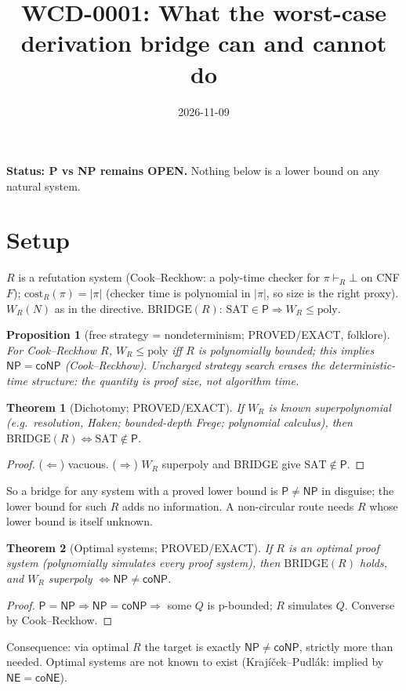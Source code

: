 \documentclass{article}\usepackage{amsmath,amssymb,amsthm}
\newtheorem{thm}{Theorem}\newtheorem{prop}{Proposition}\newtheorem{cor}{Corollary}
\begin{document}
\title{WCD-0001: What the worst-case derivation bridge can and cannot do}\date{2026-11-09}\maketitle
\noindent\textbf{Status: P vs NP remains OPEN.} Nothing below is a lower bound on any natural system.

\section*{Setup}
$R$ is a refutation system (Cook--Reckhow: a poly-time checker for $\pi\vdash_R\bot$ on CNF $F$); $\mathrm{cost}_R(\pi)=|\pi|$ (checker time is polynomial in $|\pi|$, so size is the right proxy).
$W_R(N)$ as in the directive. $\mathrm{BRIDGE}(R)$: $\mathrm{SAT}\in\mathsf P\Rightarrow W_R\le\mathrm{poly}$.

\begin{prop}[free strategy = nondeterminism; PROVED/EXACT, folklore]
For Cook--Reckhow $R$, $W_R\le\mathrm{poly}$ iff $R$ is polynomially bounded; this implies $\mathsf{NP}=\mathsf{coNP}$ (Cook--Reckhow). Uncharged strategy search erases the deterministic-time structure: the quantity is proof size, not algorithm time.
\end{prop}

\begin{thm}[Dichotomy; PROVED/EXACT]
If $W_R$ is known superpolynomial (e.g.\ resolution, Haken; bounded-depth Frege; polynomial calculus), then $\mathrm{BRIDGE}(R)\iff \mathrm{SAT}\notin\mathsf P$.
\end{thm}
\begin{proof}($\Leftarrow$) vacuous. ($\Rightarrow$) $W_R$ superpoly and BRIDGE give $\mathrm{SAT}\notin\mathsf P$.\end{proof}
\noindent So a bridge for any system with a proved lower bound is $\mathsf P\neq\mathsf{NP}$ in disguise; the lower bound for such $R$ adds no information. A non-circular route needs $R$ whose lower bound is itself unknown.

\begin{thm}[Optimal systems; PROVED/EXACT]
If $R$ is an optimal proof system (polynomially simulates every proof system), then $\mathrm{BRIDGE}(R)$ holds, and $W_R$ superpoly $\iff \mathsf{NP}\neq\mathsf{coNP}$.
\end{thm}
\begin{proof}$\mathsf P=\mathsf{NP}\Rightarrow\mathsf{NP}=\mathsf{coNP}\Rightarrow$ some $Q$ is p-bounded; $R$ simulates $Q$. Converse by Cook--Reckhow.\end{proof}
\noindent Consequence: via optimal $R$ the target is exactly $\mathsf{NP}\ne\mathsf{coNP}$, strictly more than needed. Optimal systems are not known to exist (Krajíček--Pudlák: implied by $\mathsf{NE}=\mathsf{coNE}$).
\end{document}
